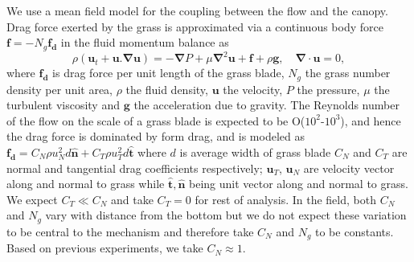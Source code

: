 \documentclass[aps,prl,reprint,twocolumn,showpacs,superscriptaddress,10pt]{revtex4-1}  %
\newcommand{\bn}{{\boldsymbol{\hat{n}}}}
\newcommand{\bt}{{\boldsymbol{\hat{t}}}}
\newcommand{\bu}{\mathbf{u}}
\newcommand{\grad}{\mathbf{\nabla}}
\newcommand{\shreyas}[1]{}
\begin{document}
We use a mean field model for the coupling between the flow and the canopy. 
Drag force exerted by the grass is approximated via a continuous body force $\mathbf{f}=-N_g\mathbf{f_d}$ in the fluid momentum balance\cite{Vivoni98,Nepf99,Ghisal02,Delangre04,Delangre06} as
\begin{equation}
\rho \left(\bu_{t}+\bu.\grad\bu \right) = -\grad P+\mu\grad^{2}\bu +\mathbf{f}+\rho\mathbf{g}, \quad \grad\cdot\bu = 0,
\label{navier-stokes}
\end{equation}
where $\mathbf{f_{d}}$ is drag force per unit length of the grass blade, $N_g$ the grass number density per unit area, $\rho$ the fluid density, $\mathbf{u}$ the velocity, 
$P$ the pressure, $\mu$ the turbulent viscosity and $\mathbf{g}$ the acceleration due to gravity. 
The Reynolds number of the flow on the scale of a grass blade is expected to be O($10^2$-$10^3$), and hence the drag force is dominated by form drag, and is modeled as 
$\mathbf{f_{d}}=C_N \rho u_{N}^{2}d\bn + C_{T}\rho u_{T}^{2}d\bt$ \shreyas{citation needed} 
where $d$ is average width of grass blade $C_{N}$ and $C_{T}$ are normal and tangential drag coefficients respectively; $\bu_{T}$, $\bu_{N}$ are velocity vector along and
normal to grass while $\bt,\bn$ being unit vector along and normal to grass. 
We expect $C_T \ll C_N$ and take $C_T=0$ for rest of analysis. 
In the field, both $C_N$ and $N_g$ vary with distance from the bottom but we do not expect these variation to be central to the mechanism and therefore take $C_N$ and $N_g$ to be constants. 
Based on previous experiments\cite{Vivoni98}, we take $C_N \approx 1$.
\end{document}
